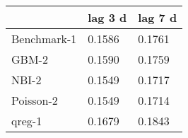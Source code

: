 \begin{tabular}{lll}
\toprule
 & lag 3 d & lag 7 d \\
\midrule
Benchmark-1 & 0.1586 & 0.1761 \\
GBM-2 & 0.1590 & 0.1759 \\
NBI-2 & 0.1549 & 0.1717 \\
Poisson-2 & 0.1549 & 0.1714 \\
qreg-1 & 0.1679 & 0.1843 \\
\bottomrule
\end{tabular}
